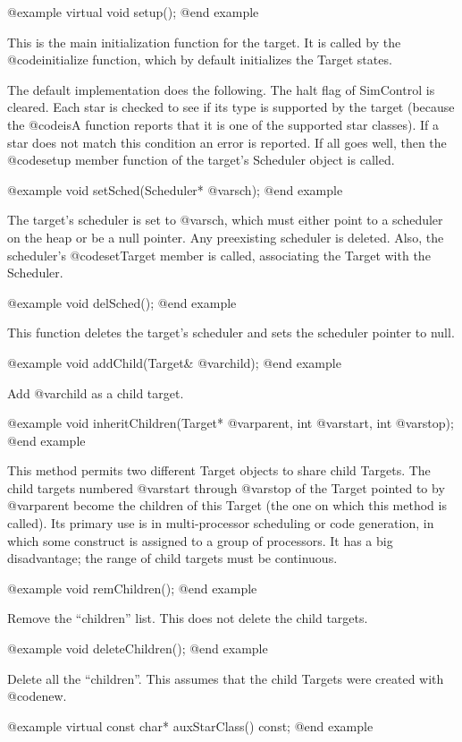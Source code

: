 @example
virtual void setup();
@end example

This is the main initialization function for the target.  It is called
by the @code{initialize} function, which by default initializes the
Target states.

The default implementation does the following.  The halt flag of
SimControl is cleared.  Each star is checked to see if its type is
supported by the target (because the @code{isA} function reports
that it is one of the supported star classes).  If a star does not
match this condition an error is reported.  If all goes well, then
the @code{setup} member function of the target's Scheduler object
is called.

@example
void setSched(Scheduler* @var{sch});
@end example

The target's scheduler is set to @var{sch}, which must either point to a
scheduler on the heap or be a null pointer.  Any preexisting scheduler
is deleted.  Also, the scheduler's @code{setTarget} member is called,
associating the Target with the Scheduler.

@example
void delSched();
@end example

This function deletes the target's scheduler and sets the scheduler
pointer to null.

@example
void addChild(Target& @var{child});
@end example

Add @var{child} as a child target.

@example
void inheritChildren(Target* @var{parent}, int @var{start}, int @var{stop});
@end example

This method permits two different Target objects to share child Targets.
The child targets numbered @var{start} through @var{stop} of the Target
pointed to by @var{parent} become the children of this Target (the one
on which this method is called).  Its primary use is in multi-processor
scheduling or code generation, in which some construct is assigned to
a group of processors.  It has a big disadvantage; the range of child
targets must be continuous.

@example
void remChildren();
@end example

Remove the ``children'' list.  This does not delete the child targets.

@example
void deleteChildren();
@end example

Delete all the ``children''.  This assumes that the child Targets
were created with @code{new}.

@example
virtual const char* auxStarClass() const;
@end example


